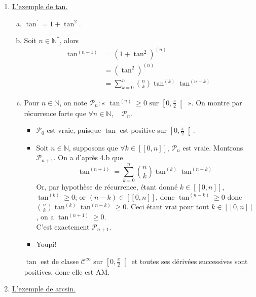 \documentclass[17pt]{article}
\def\N{\mathbb N}
\def\Cinf{\mathcal{C}^{\infty}}
\begin{document}
\begin{enumerate}
\begin{enumerate}[a)]
			\item On suppose que $f^\prime$ est AM sur $[0,\alpha[$. On sait alors que $f^\prime$ est de classe $\Cinf$ et que pour tout $n\in\N$, $\left(f^\prime\right)^{(n)}$ est positive. En particulier, $\left(f^\prime\right)^{(0)}=f^\prime$ est positive, donc $f$ est croissante, donc $\forall x\in[0,\alpha[,\ f(x)\geq f(0)$ donc $\forall x\in[0,\alpha[,\ (f-f(0))(x)\geq 0$. Ainsi, $f-f(0)$ est de classe $\Cinf$, est positive, toutes ses dérivées successives le sont aussi, donc elle est AM.
		\end{enumerate}
		\item \underline{L'exemple de tan.}
		\begin{enumerate}[a)]
			\item $\tan^\prime=1+\tan^2$.
			\item Soit $n\in\N^*$, alors 
			\begin{align*}
				\tan^{(n+1)}&=(1+\tan^2)^{(n)}\\
							&=(\tan^2)^{(n)}\\
							&=\sum_{k=0}^n\binom nk\tan^{(k)}\tan^{(n-k)}
			\end{align*}
			\item Pour $n\in\N$, on note $\mathcal{P}_n:\text{« }\tan^{(n)}\geq0\text{ sur }\left[0,\frac\pi2\right[\text{ »}$. On montre par récurrence forte que $\forall n\in\N,\quad \mathcal{P}_n$.
			\begin{itemize}
				\item $\mathcal P_0$ est vraie, puisque $\tan$ est positive sur $\left[0,\frac\pi2\right[$.
				\item Soit $n\in\N$, supposons que $\forall k\in[\![0,n]\!]$, $\mathcal P_n$ est vraie. Montrons $\mathcal P_{n+1}$. On a d'après 4.b que \[\tan^{(n+1)}=\sum_{k=0}^n\binom nk\tan^{(k)}\tan^{(n-k)}\]
				Or, par hypothèse de récurrence, étant donné $k\in[\![0,n]\!]$, $\tan^{(k)}\geq 0$; or $(n-k)\in[\![0,n]\!]$, donc $\tan^{(n-k)}\geq 0$ donc $\binom nk\tan^{(k)}\tan^{(n-k)}\geq 0$. Ceci étant vrai pour tout $k\in[\![0,n]\!]$, on a $\tan^{(n+1)}\geq 0$.\\
				C'est exactement $\mathcal P_{n+1}$.
				\item Youpi!
			\end{itemize}
			$\tan$ est de classe $\Cinf$ sur $\left[0,\frac\pi2\right[$ et toutes ses dérivées successives sont positives, donc elle est AM.
		\end{enumerate}
		\item \underline{L'exemple de arcsin.}
		\begin{enumerate}[a)]

\end{enumerate}
\end{enumerate}
\end{document}
